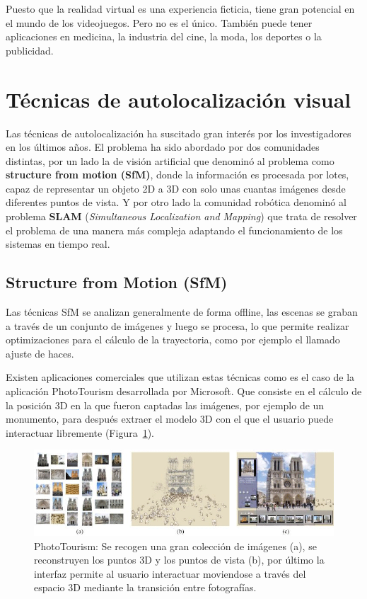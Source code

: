 Puesto que la realidad virtual es una experiencia ficticia, tiene gran potencial en el mundo de los videojuegos. Pero no es el único. También puede tener aplicaciones en medicina, la industria del cine, la moda, los deportes o la publicidad.

\section{Técnicas de autolocalización visual}

Las técnicas de autolocalización ha suscitado gran interés por los investigadores en los últimos años. El problema ha sido abordado por dos comunidades distintas, por un lado la de visión artificial que denominó al problema como \textbf{structure from motion (SfM)}, donde la información es procesada por lotes, capaz de representar un objeto 2D a 3D con solo unas cuantas imágenes desde diferentes puntos de vista. Y por otro lado la comunidad robótica denominó al problema \textbf{SLAM} (\textit{Simultaneous Localization and Mapping}) que trata de resolver el problema de una manera más compleja adaptando el funcionamiento de los sistemas en tiempo real.

\subsection{Structure from Motion (SfM)}

Las técnicas SfM se analizan generalmente de forma offline, las escenas se graban a través de un conjunto de imágenes y luego se procesa, lo que permite realizar optimizaciones para el cálculo de la trayectoria, como por ejemplo el llamado ajuste de haces.

Existen aplicaciones comerciales que utilizan estas técnicas como es el caso de la aplicación PhotoTourism \parencite{Reference2} desarrollada por Microsoft. Que consiste en el cálculo de la posición 3D en la que fueron captadas las imágenes, por ejemplo de un monumento, para después extraer el modelo 3D con el que el usuario puede interactuar libremente (Figura~\ref{fig:Tourism}).

\begin{figure}[th]
\centering
\includegraphics[scale=0.57]{Figures/phototourism.png}
\decoRule
\caption[PhotoTourism]{PhotoTourism: Se recogen una gran colección de imágenes (a), se reconstruyen los puntos 3D y los puntos de vista (b), por último la interfaz permite al usuario interactuar moviendose a través del espacio 3D mediante la transición entre fotografías.}
\label{fig:Tourism}
\end{figure}

